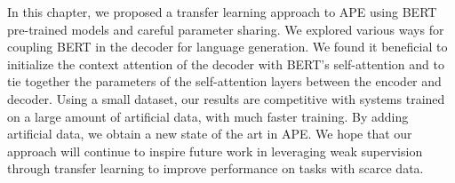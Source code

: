 In this chapter, we proposed a transfer learning approach to APE
using BERT pre-trained models and careful parameter sharing. We
explored various ways for coupling BERT in the decoder for language
generation. We found it beneficial to initialize the context
attention of the decoder with BERT's self-attention and to tie
together the parameters of the self-attention layers between the
encoder and decoder. Using a small dataset, our results are
competitive with systems trained on a large amount of artificial
data, with much faster training. By adding artificial data, we obtain
a new state of the art in APE. We hope that our approach will
continue to inspire future work in leveraging weak supervision
through transfer learning to improve performance on tasks with scarce
data.

\cleardoublepage

